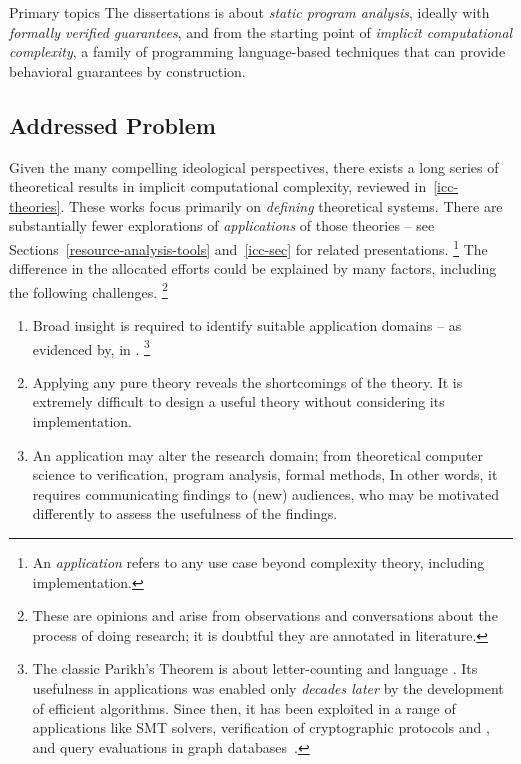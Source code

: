 \begin{infobox}[]{Primary topics}
The dissertations is about \emph{static program analysis},
ideally with \emph{formally verified guarantees},
and from the starting point of \emph{implicit computational
complexity}, a family of programming language-based techniques that can
provide behavioral guarantees by construction.
\end{infobox}

\subsection{Addressed Problem}
\label{subsec:problem}

Given the many compelling ideological perspectives, there exists a long series of theoretical results in implicit computational complexity, reviewed in~\autoref{icc-theories}.
These works focus primarily on \emph{defining} theoretical systems.
There are substantially fewer explorations of \emph{applications} of those theories -- see Sections~\ref{resource-analysis-tools} and~\ref{icc-sec} for related presentations.%
\footnote{An \emph{application} refers to any use case beyond complexity theory, including implementation.}
The difference in the allocated efforts could be explained by many factors, including the following challenges.%
\footnote{These are opinions and arise from observations and conversations about the process of doing research; it is doubtful they are annotated in literature.}

\begin{enumerate}

\item Broad insight is required to identify suitable application domains -- as
      evidenced by, \eg {} in .%
      \footnote{The classic Parikh's Theorem is about letter-counting and language .
      Its usefulness in applications was enabled only \emph{decades later} by the development of efficient algorithms.
      Since then,  it has been exploited in a range of applications like SMT solvers, verification of cryptographic protocols and , and query evaluations in graph databases~\cite[pg. 2]{hague2024}.}

\item Applying any pure theory reveals the shortcomings of the theory.
      It is extremely difficult to design a useful theory without considering its implementation.

\item An application may alter the research domain; \eg from theoretical computer science to verification, program analysis, formal methods, \etc
      In other words, it requires communicating findings to (new) audiences, who may be motivated differently to assess the usefulness of the findings.

\end{enumerate}

